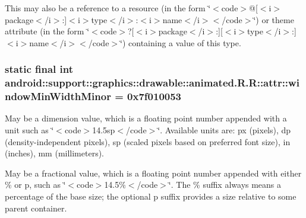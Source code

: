 This may also be a reference to a resource (in the form \char`\"{}$<$code$>$@\mbox{[}$<$i$>$package$<$/i$>$:\mbox{]}$<$i$>$type$<$/i$>$:$<$i$>$name$<$/i$>$$<$/code$>$\char`\"{}) or theme attribute (in the form \char`\"{}$<$code$>$?\mbox{[}$<$i$>$package$<$/i$>$:\mbox{]}\mbox{[}$<$i$>$type$<$/i$>$:\mbox{]}$<$i$>$name$<$/i$>$$<$/code$>$\char`\"{}) containing a value of this type. \hypertarget{classandroid_1_1support_1_1graphics_1_1drawable_1_1animated_1_1_r_1_1attr_4abf1c6c67ae2c0291ee4137464d98fd}{
\subsubsection[{windowMinWidthMinor}]{\setlength{\rightskip}{0pt plus 5cm}static final int android::support::graphics::drawable::animated.R.R::attr::windowMinWidthMinor = 0x7f010053}}
\label{classandroid_1_1support_1_1graphics_1_1drawable_1_1animated_1_1_r_1_1attr_4abf1c6c67ae2c0291ee4137464d98fd}


May be a dimension value, which is a floating point number appended with a unit such as \char`\"{}$<$code$>$14.5sp$<$/code$>$\char`\"{}. Available units are: px (pixels), dp (density-independent pixels), sp (scaled pixels based on preferred font size), in (inches), mm (millimeters). 

May be a fractional value, which is a floating point number appended with either \% or p, such as \char`\"{}$<$code$>$14.5\%$<$/code$>$\char`\"{}. The \% suffix always means a percentage of the base size; the optional p suffix provides a size relative to some parent container. 

